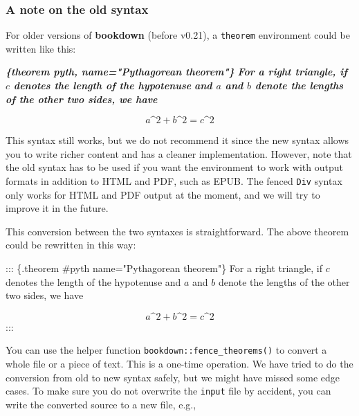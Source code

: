\documentclass[
  12pt,
]{krantz}
\newenvironment{Shaded}{\begin{snugshade}}{\end{snugshade}}
\newcommand{\InformationTok}[1]{\textcolor[rgb]{0.56,0.35,0.01}{\textbf{\textit{#1}}}}
\newcommand{\NormalTok}[1]{#1}
\theoremstyle{definition}
\theoremstyle{definition}
\theoremstyle{definition}
\theoremstyle{definition}
\theoremstyle{remark}
\begin{document}
\hypertarget{theorem-engine}{%
\subsubsection{A note on the old syntax}\label{theorem-engine}}

For older versions of \textbf{bookdown} (before v0.21), a \texttt{theorem} environment could be written like this:

\begin{Shaded}
\begin{Highlighting}[]
\InformationTok{\textasciigrave{}\textasciigrave{}\textasciigrave{}\{theorem pyth, name="Pythagorean theorem"\}}
\InformationTok{For a right triangle, if $c$ denotes the length of the hypotenuse}
\InformationTok{and $a$ and $b$ denote the lengths of the other two sides, we have}

\InformationTok{$$a\^{}2 + b\^{}2 = c\^{}2$$}
\InformationTok{\textasciigrave{}\textasciigrave{}\textasciigrave{}}
\end{Highlighting}
\end{Shaded}

This syntax still works, but we do not recommend it since the new syntax allows you to write richer content and has a cleaner implementation. However, note that the old syntax has to be used if you want the environment to work with output formats in addition to HTML and PDF, such as EPUB. The fenced \texttt{Div} syntax only works for HTML and PDF output at the moment, and we will try to improve it in the future.

This conversion between the two syntaxes is straightforward. The above theorem could be rewritten in this way:

\begin{Shaded}
\begin{Highlighting}[]
\NormalTok{::: \{.theorem \#pyth name="Pythagorean theorem"\}}
\NormalTok{For a right triangle, if $c$ denotes the length of the hypotenuse}
\NormalTok{and $a$ and $b$ denote the lengths of the other two sides, we have}

\NormalTok{$$a\^{}2 + b\^{}2 = c\^{}2$$}
\NormalTok{:::}
\end{Highlighting}
\end{Shaded}

You can use the helper function \texttt{bookdown::fence\_theorems()} to convert a whole file or a piece of text. This is a one-time operation. We have tried to do the conversion from old to new syntax safely, but we might have missed some edge cases. To make sure you do not overwrite the \texttt{input} file by accident, you can write the converted source to a new file, e.g.,
\end{document}
